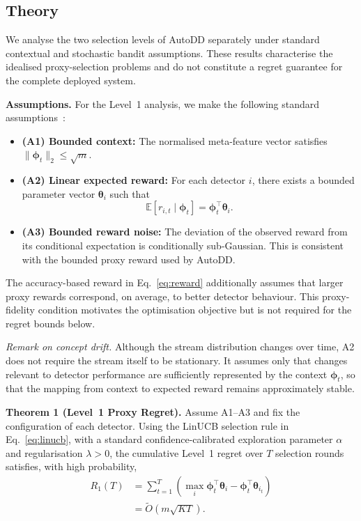\documentclass[conference]{IEEEtran}
\begin{document}
\subsection{Theory}
\label{sec:theory}

We analyse the two selection levels of AutoDD separately under standard contextual and stochastic bandit assumptions. These results characterise the idealised proxy-selection problems and do not constitute a regret guarantee for the complete deployed system.

\textbf{Assumptions.}
For the Level~1 analysis, we make the following standard assumptions~\cite{Abbasi2011Improved,Lattimore2020Bandit}:
\begin{itemize}
    \item \textbf{(A1) Bounded context:}
    The normalised meta-feature vector satisfies
    $\|\boldsymbol{\phi}_t\|_2 \leq \sqrt{m}$.

    \item \textbf{(A2) Linear expected reward:}
    For each detector $i$, there exists a bounded parameter vector
    $\boldsymbol{\theta}_i$ such that
    \begin{equation}
    \mathbb{E}[r_{i,t}\mid\boldsymbol{\phi}_t]
    =
    \boldsymbol{\phi}_t^\top\boldsymbol{\theta}_i .
    \end{equation}

    \item \textbf{(A3) Bounded reward noise:}
    The deviation of the observed reward from its conditional expectation is conditionally sub-Gaussian. This is consistent with the bounded proxy reward used by AutoDD.
\end{itemize}

The accuracy-based reward in Eq.~\eqref{eq:reward} additionally assumes that larger proxy rewards correspond, on average, to better detector behaviour. This proxy-fidelity condition motivates the optimisation objective but is not required for the regret bounds below.

\emph{Remark on concept drift.}
Although the stream distribution changes over time, A2 does not require the stream itself to be stationary. It assumes only that changes relevant to detector performance are sufficiently represented by the context $\boldsymbol{\phi}_t$, so that the mapping from context to expected reward remains approximately stable.


\textbf{Theorem 1 (Level~1 Proxy Regret).}
Assume A1--A3 and fix the configuration of each detector. Using the LinUCB selection rule in Eq.~\eqref{eq:linucb}, with a standard confidence-calibrated exploration parameter $\alpha$ and regularisation $\lambda>0$, the cumulative Level~1 regret over $T$ selection rounds satisfies, with high probability,
\begin{equation}
\begin{aligned}
R_1(T)
&=
\sum_{t=1}^{T}
\left(
\max_i
\boldsymbol{\phi}_t^\top\boldsymbol{\theta}_i
-
\boldsymbol{\phi}_t^\top\boldsymbol{\theta}_{i_t}
\right) \\
&=
\tilde{O}\!\left(m\sqrt{KT}\right).
\end{aligned}
\end{equation}
\end{document}
